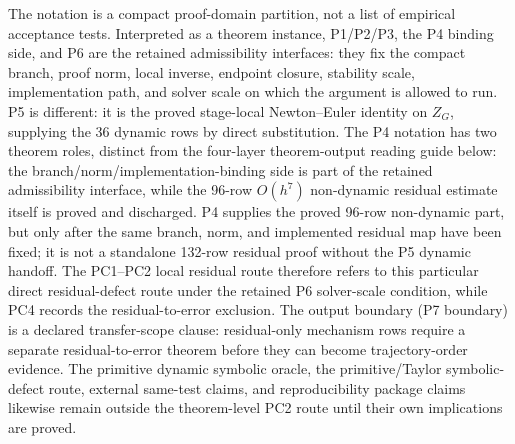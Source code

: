 \documentclass[preprint,12pt]{elsarticle}
\begin{document}
The notation is a compact proof-domain partition, not a list of empirical
acceptance tests.  Interpreted as a theorem instance, P1/P2/P3, the P4 binding side, and
P6 are the retained admissibility interfaces: they fix the compact branch,
proof norm, local inverse, endpoint closure, stability scale, implementation
path, and solver scale on which the argument is allowed to run.  P5 is different: it is the
proved stage-local Newton--Euler identity on \(Z_G\), supplying the 36
dynamic rows by direct substitution.  The P4 notation has two theorem roles,
distinct from the four-layer theorem-output reading guide below:
the branch/norm/implementation-binding side is part of the retained admissibility
interface, while the 96-row \(O(h^7)\) non-dynamic residual estimate itself is
proved and discharged.  P4 supplies the proved 96-row non-dynamic part, but
only after the same branch, norm, and implemented
residual map have been fixed; it is not a standalone 132-row residual proof
without the P5 dynamic handoff.  The PC1--PC2 local residual route therefore
refers to this particular direct residual-defect route under the retained P6
solver-scale condition, while PC4 records the
residual-to-error exclusion.  The output boundary (P7 boundary) is a
declared transfer-scope clause: residual-only mechanism rows require a separate
residual-to-error theorem before they can become trajectory-order evidence.
The primitive dynamic symbolic oracle, the primitive/Taylor symbolic-defect
route, external same-test claims, and reproducibility package claims likewise remain
outside the theorem-level PC2 route until their own implications are proved.
\end{document}
